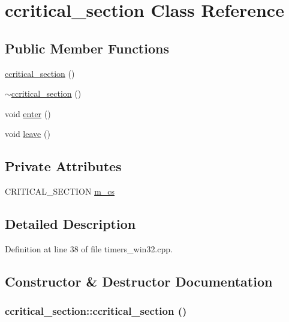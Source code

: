 \hypertarget{classccritical__section}{
\section{ccritical\_\-section Class Reference}
\label{classccritical__section}
}
\subsection*{Public Member Functions}
\begin{CompactItemize}
\item 
\hyperlink{classccritical__section_b373df4a1457e4d91117ae8dd052f152}{ccritical\_\-section} ()
\item 
\hyperlink{classccritical__section_9afc8d8a935bb51b02e9ef9bc7241466}{$\sim$ccritical\_\-section} ()
\item 
void \hyperlink{classccritical__section_94af8f7f73229ecc82a303be7e2b0ad0}{enter} ()
\item 
void \hyperlink{classccritical__section_e1f542404005a2f0696ced6c52a8ce3b}{leave} ()
\end{CompactItemize}
\subsection*{Private Attributes}
\begin{CompactItemize}
\item 
CRITICAL\_\-SECTION \hyperlink{classccritical__section_102f1ff74ca1adffa1868c3b9d5fb7bb}{m\_\-cs}
\end{CompactItemize}


\subsection{Detailed Description}




Definition at line 38 of file timers\_\-win32.cpp.

\subsection{Constructor \& Destructor Documentation}
\hypertarget{classccritical__section_b373df4a1457e4d91117ae8dd052f152}{
\subsubsection[ccritical\_\-section]{\setlength{\rightskip}{0pt plus 5cm}ccritical\_\-section::ccritical\_\-section ()}}
\label{classccritical__section_b373df4a1457e4d91117ae8dd052f152}




